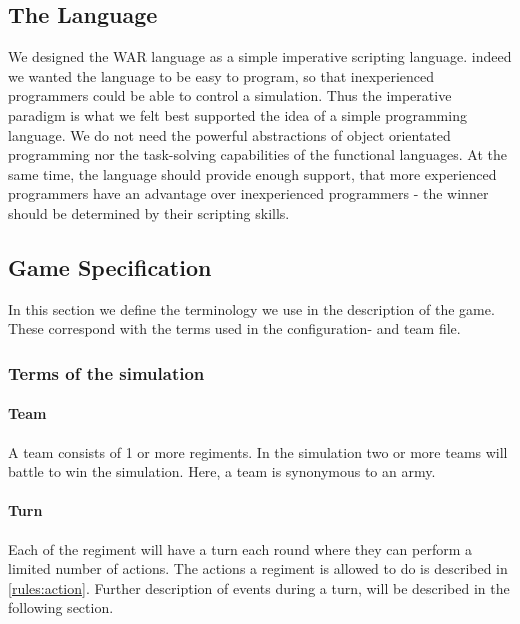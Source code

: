 	\subsection{The Language}
		We designed the WAR language as a simple imperative scripting language. 
		indeed we wanted the language to be easy to program, so that inexperienced programmers could be able to control a simulation. Thus the imperative paradigm is what we felt best supported the idea of a simple programming language. We do not need the
		powerful abstractions of object orientated programming nor the task-solving capabilities of the functional languages. At the same time, the language should provide enough support, that more experienced programmers have an advantage over inexperienced programmers - the winner should be determined by their scripting skills.
		
		 
	\subsection{Game Specification}
	In this section we define the terminology we use in the description of the game.
	These correspond with the terms used in the configuration- and team file.
	
		\subsubsection{Terms of the simulation}
		
		\paragraph{Team}		
		A team consists of 1 or more regiments. In the simulation two or more teams will battle to win the simulation. Here, a team is synonymous to an army.
		
		\paragraph{Turn}
		Each of the regiment will have a turn each round where they can perform a limited number of actions. 
		The actions a regiment is allowed to do is described in \ref{rules:action}.
		Further description of events during a turn, will be described in the following section.
		
